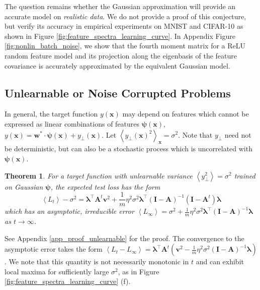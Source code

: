 \documentclass{article} %
\def\x{\bm x}
\def\w{\bm w}
\newtheorem{theorem}{Theorem}
\def\x{\mathbf x}
\def\w{\mathbf w}
\def\A{\mathbf A}
\def\I{\mathbf I}
\begin{document}
The question remains whether the Gaussian approximation will provide an accurate model on \textit{realistic data}. We do not provide a proof of this conjecture, but verify its accuracy in empirical experiments on MNIST and CIFAR-10 as shown in Figure \ref{fig:feature_spectra_learning_curve}. In Appendix Figure \ref{fig:nonlin_batch_noise}, we show that the fourth moment matrix for a ReLU random feature model and its projection along the eigenbasis of the feature covariance is accurately approximated by the equivalent Gaussian model. %

\subsection{Unlearnable or Noise Corrupted Problems}

In general, the target function $y(\x)$ may depend on features which cannot be expressed as linear combinations of features $\bm\psi(\x)$, $y(\x) = \w^* \cdot \bm\psi(\x) + y_\perp(\x)$. Let $\left< y_\perp(\x)^2 \right>_\x=\sigma^2$. Note that $y_{\perp}$ need not be deterministic, but can also be a stochastic process which is uncorrelated with $\bm\psi(\x)$.

\begin{theorem}\label{th_unlearnable}
For a target function with unlearnable variance $\left< y_{\perp}^2 \right> = \sigma^2$ trained on Gaussian $\bm\psi$, the expected test loss has the form
\begin{equation}
    \left< L_t \right> - \sigma^2 = \bm\lambda^\top \A^t \mathbf{v}^2 + \frac{1}{m} \eta^2\sigma^2 \bm\lambda^\top (\I - \A)^{-1} (\I - \A^t) \bm\lambda
\end{equation}
which has an asymptotic, irreducible error $\left< L_\infty \right> = \sigma^2 + \frac{1}{m} \eta^2 \sigma^2 \bm\lambda^\top (\I - \A)^{-1} \bm\lambda$ as $t \to \infty$.
\end{theorem}
See Appendix \ref{app_proof_unlearnable} for the proof. The convergence to the asymptotic error takes the form $\left< L_t - L_\infty\right> = \bm\lambda^\top \A^t \left( \mathbf{v}^2 - \frac{1}{m} \eta^2 \sigma^2 (\I - \A)^{-1} \bm\lambda \right)$. We note that this quantity is not necessarily monotonic in $t$ and can exhibit local maxima for sufficiently large $\sigma^2$, as in Figure \ref{fig:feature_spectra_learning_curve} (f).  %
\end{document}
